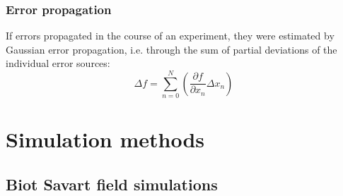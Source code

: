         \subsubsection{Error propagation}
           If errors propagated in the course of an experiment, they were estimated by Gaussian error propagation, i.e. through the sum of partial deviations of the individual error sources:
           \begin{equation}
               \Delta f = \sum_{n=0}^{N}(\frac{\partial f}{\partial x_n} \Delta x_n)
           \end{equation}

\section{Simulation methods}\label{chapter:simulations}
\subsection{Biot Savart field simulations}
